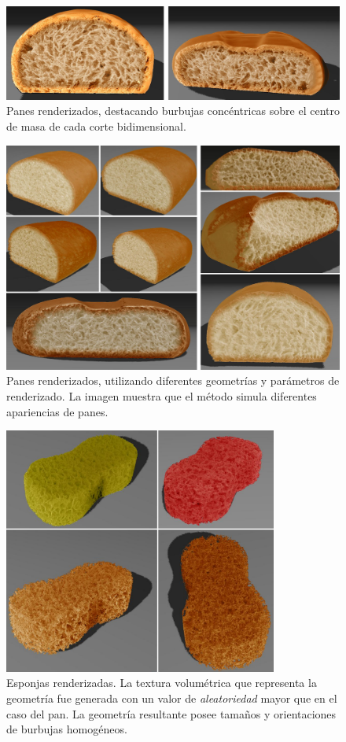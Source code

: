\begin{figure}
  \centerline{\includegraphics[width=12cm]{figures/Fig11CAVW}}
  \caption{Panes renderizados, destacando burbujas concéntricas sobre el centro de masa de cada corte bidimensional.}
  \label{fg:Fig11}
\end{figure}

\begin{figure}
  \centerline{\includegraphics[width=13cm]{figures/Fig12CAVW}}
  \caption{Panes renderizados, utilizando diferentes geometrías y parámetros de renderizado. La imagen muestra que el método simula diferentes apariencias de panes.}
  \label{fg:Fig12}
\end{figure}

\begin{figure}
  \centerline{\includegraphics[width=9cm]{figures/Fig13CAVW}}
  \caption{Esponjas renderizadas. La textura volumétrica que representa la geometría fue generada con un valor de {\em aleatoriedad} mayor que en el caso del pan. La geometría resultante posee tamaños y orientaciones de burbujas homogéneos.}
  \label{fg:Fig13}
\end{figure}

